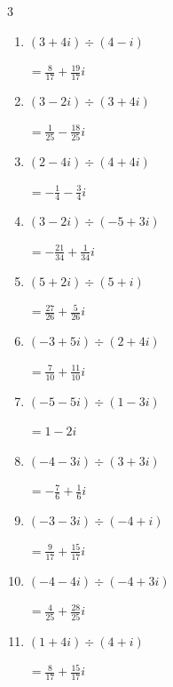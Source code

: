 \begin{multicols}{3}
\begin{enumerate}
        $\displaystyle =-\frac{1}{10}+\frac{7}{10}i$

\columnbreak %

\resetques

  \item $\displaystyle (3+4i)\div(4-i)$

        $\displaystyle =\frac{8}{17}+\frac{19}{17}i$

  \item $\displaystyle (3-2i)\div(3+4i)$

        $\displaystyle =\frac{1}{25}-\frac{18}{25}i$

  \item $\displaystyle (2-4i)\div(4+4i)$

        $\displaystyle =-\frac{1}{4}-\frac{3}{4}i$

  \item $\displaystyle (3-2i)\div(-5+3i)$

        $\displaystyle =-\frac{21}{34}+\frac{1}{34}i$

  \item $\displaystyle (5+2i)\div(5+i)$

        $\displaystyle =\frac{27}{26}+\frac{5}{26}i$

  \item $\displaystyle (-3+5i)\div(2+4i)$

        $\displaystyle =\frac{7}{10}+\frac{11}{10}i$

  \item $\displaystyle (-5-5i)\div(1-3i)$

        $\displaystyle =1-2i$

  \item $\displaystyle (-4-3i)\div(3+3i)$

        $\displaystyle =-\frac{7}{6}+\frac{1}{6}i$

  \item $\displaystyle (-3-3i)\div(-4+i)$

        $\displaystyle =\frac{9}{17}+\frac{15}{17}i$

  \item $\displaystyle (-4-4i)\div(-4+3i)$

        $\displaystyle =\frac{4}{25}+\frac{28}{25}i$

\columnbreak %

  \item $\displaystyle (1+4i)\div(4+i)$

        $\displaystyle =\frac{8}{17}+\frac{15}{17}i$


\end{enumerate}
\end{multicols}
